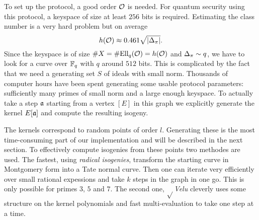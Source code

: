 \documentclass[../main/main.tex]{subfiles}
\begin{document}
To set up the protocol, a good order $\mathcal{O}$ is needed.
For quantum security using this protocol, a keyspace of size at least $256$ bits is required.
Estimating the class number is a very hard problem but on average
\[
	h(\mathcal{O}) \approx 0.461\sqrt{\left|\Delta_{\pi}\right|}.
\]
Since the keyspace is of size $\# X= \# \text{Ell}_q(\mathcal{O}) = h(\mathcal{O})$ and $\Delta_{\pi}\sim q$, we have to look for a curve over $\mathbb{F}_q$ with $q$ around $512$ bits.
This is complicated by the fact that we need a generating set $S$ of ideals with small norm.
Thousands of computer hours have been spent generating some usable protocol parameters: sufficiently many primes of small norm and a large enough keyspace.
To actually take a step $\mathfrak{a}$ starting from a vertex $[E]$ in this graph we explicitly generate the kernel $E[\mathfrak{a}]$ and compute the resulting isogeny.

The kernels correspond to random points of order $l$.
Generating these is the most time-consuming part of our implementation and will be described in the next section.
To effectively compute isogenies from these points two methodes are used.
The fastest, using \textit{radical isogenies}, transform the starting curve in Montgomery form into a Tate normal curve.
Then one can iterate very efficiently over small rational expessions and take $k$ steps in the graph in one go.
This is only possible for primes $3$, $5$ and $7$.
The second one, $\sqrt{}$\textit{Velu} cleverly uses some structure on the kernel polynomials and fast multi-evaluation to take one step at a time.
\end{document}
